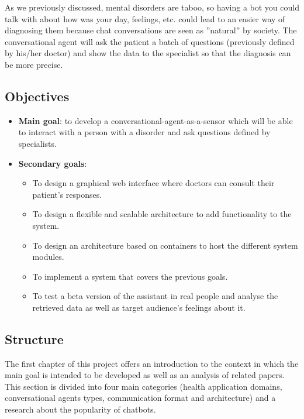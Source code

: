 \documentclass[12pt,english]{article}
\begin{document}
As we previously discussed, mental disorders are taboo, so having a bot you could talk with about how was your day, feelings, etc. could lead to an easier way of diagnosing them because chat conversations are seen as ''natural'' by society. The conversational agent will ask the patient a batch of questions (previously defined by his/her doctor) and show the data to the specialist so that the diagnosis can be more precise.

\newpage

\subsection{Objectives}

\begin{itemize}
  \item \textbf{Main goal}: to develop a conversational-agent-as-a-sensor which will be able to interact with a person with a disorder and ask questions defined by specialists.
  \item \textbf{Secondary goals}:
    \begin{itemize}
      \item To design a graphical web interface where doctors can consult their patient's responses.
      \item To design a flexible and scalable architecture to add functionality to the system.
      \item To design an architecture based on containers to host the different system modules.
      \item To implement a system that covers the previous goals.
      \item To test a beta version of the assistant in real people and analyse the retrieved data as well as target audience's feelings about it.
    \end{itemize}
\end{itemize}

\subsection{Structure}

The first chapter of this project offers an introduction to the context in which the main goal is intended to be developed as well as an analysis of related papers. This section is divided into four main categories (health application domains, conversational agents types, communication format and architecture) and a research about the popularity of chatbots.\\
\end{document}
